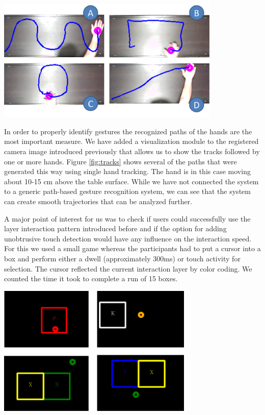 \begin{minipage}{\linewidth}
\centering
\includegraphics[width=0.8\textwidth]{images/tracks}
\label{fig:tracks}
\end{minipage}

In order to properly identify gestures the recognized paths of the hands are the most important measure. We have added a visualization module to the registered camera image introduced previously that allows us to show the tracks followed by one or more hands. Figure \ref{fig:tracks} shows several of the paths that were generated this way using single hand tracking. The hand is in this case moving about 10-15 cm above the table surface. While we have not connected the system to a generic path-based gesture recognition system, we can see that the system can create smooth trajectories that can be analyzed further.

A major point of interest for us was to check if users could successfully use the layer interaction pattern introduced before and if the option for adding unobtrusive touch detection would have any influence on the interaction speed. For this we used a small game whereas the participants had to put a cursor into a box and perform either a dwell (approximately 300ms) or touch activity for selection. The cursor reflected the current interaction layer by color coding. We counted the time it took to complete a run of 15 boxes.

\begin{minipage}{\linewidth}
\centering
\includegraphics[width=0.7\textwidth]{images/eval_speed}
\label{fig:eval_speed}
\end{minipage}

